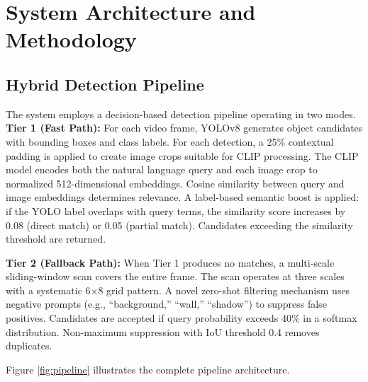 \documentclass[12pt,a4paper]{article}
\begin{document}
\section{System Architecture and Methodology}

\subsection{Hybrid Detection Pipeline}

The system employs a decision-based detection pipeline operating in two modes. \textbf{Tier 1 (Fast Path):} For each video frame, YOLOv8 generates object candidates with bounding boxes and class labels. For each detection, a 25\% contextual padding is applied to create image crops suitable for CLIP processing. The CLIP model encodes both the natural language query and each image crop to normalized 512-dimensional embeddings. Cosine similarity between query and image embeddings determines relevance. A label-based semantic boost is applied: if the YOLO label overlaps with query terms, the similarity score increases by 0.08 (direct match) or 0.05 (partial match). Candidates exceeding the similarity threshold are returned.

\textbf{Tier 2 (Fallback Path):} When Tier 1 produces no matches, a multi-scale sliding-window scan covers the entire frame. The scan operates at three scales with a systematic 6×8 grid pattern. A novel zero-shot filtering mechanism uses negative prompts (e.g., ``background,'' ``wall,'' ``shadow'') to suppress false positives. Candidates are accepted if query probability exceeds 40\% in a softmax distribution. Non-maximum suppression with IoU threshold 0.4 removes duplicates.

Figure \ref{fig:pipeline} illustrates the complete pipeline architecture.
\end{document}
